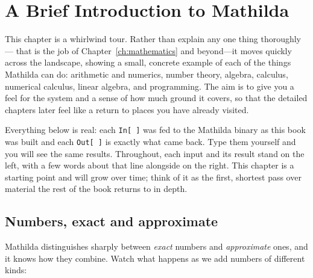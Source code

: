 \chapter{A Brief Introduction to Mathilda}
\label{ch:intro}

This chapter is a whirlwind tour. Rather than explain any one thing thoroughly---%
that is the job of Chapter~\ref{ch:mathematics} and beyond---it moves quickly across
the landscape, showing a small, concrete example of each of the things Mathilda can
do: arithmetic and numerics, number theory, algebra, calculus, numerical calculus,
linear algebra, and programming. The aim is to give you a feel for the system and a sense of how much
ground it covers, so that the detailed chapters later feel like a return to places
you have already visited.

Everything below is real: each \texttt{In[\,]} was fed to the Mathilda binary as this
book was built and each \texttt{Out[\,]} is exactly what came back. Type them yourself
and you will see the same results. Throughout, each input and its result stand on the
left, with a few words about that line alongside on the right. This chapter is a
starting point and will grow over time; think of it as the first, shortest pass over
material the rest of the book returns to in depth.

\section{Numbers, exact and approximate}
\label{sec:intro-numbers}

Mathilda distinguishes sharply between \emph{exact} numbers and \emph{approximate}
ones, and it knows how they combine. Watch what happens as we add numbers of different
kinds:

\begin{codepairs}
\end{codepairs}

